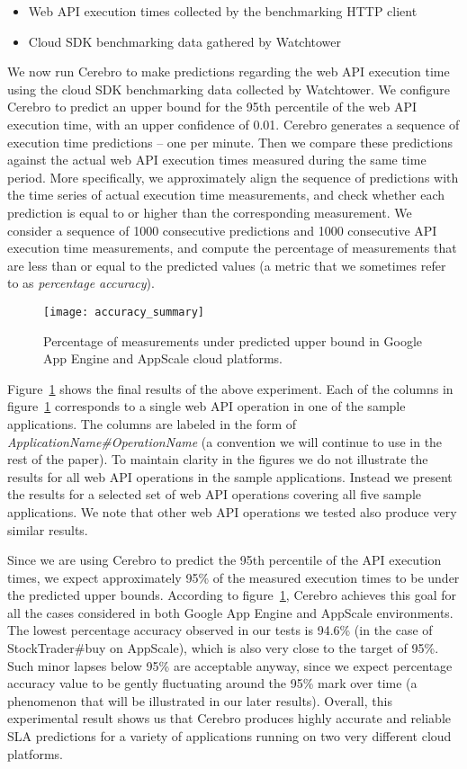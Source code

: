 \begin{itemize}
\item Web API execution times collected by the benchmarking HTTP client
\item Cloud SDK benchmarking data gathered by Watchtower
\end{itemize}

We now run Cerebro to make predictions regarding the web API execution time using the cloud SDK benchmarking data
collected by Watchtower. We configure Cerebro to predict an upper bound for the 95th percentile of the web API
execution time, with an upper confidence of 0.01. Cerebro generates a sequence of execution time predictions -- one 
per minute. Then we compare these predictions against the actual web API execution times measured during the same
time period. More specifically, we approximately align the sequence of predictions with the time series of actual execution
time measurements, and check whether each prediction is equal to or higher than the corresponding measurement. We consider a 
sequence of 1000 consecutive predictions and 1000 consecutive API execution
time measurements, and compute the percentage of measurements that are less than or equal to the predicted values (a
metric that we sometimes refer to as \textit{percentage accuracy}).
 

\begin{figure}
\centering
\texttt{[image: accuracy\_summary]}
\caption{Percentage of measurements under predicted upper bound in Google App Engine and AppScale cloud platforms.}
\label{fig:accuracy_summary}
\end{figure}

Figure~\ref{fig:accuracy_summary} shows the final results of the above experiment.
Each of the columns in figure~\ref{fig:accuracy_summary} corresponds to a single web API operation in 
one of the sample applications. The columns are labeled in the form of \textit{ApplicationName\#OperationName} (a convention 
we will continue to use in the rest of the paper). To maintain clarity in the figures we do not 
illustrate the results for all web API operations in the sample applications. Instead we present the results for a selected set of 
web API operations covering all five sample applications. We note that other web API operations we tested also produce
very similar results.

Since we are using Cerebro to predict the 95th percentile of the API execution times, we expect approximately 95\% of the measured execution
times to be under the predicted upper bounds. According to figure~\ref{fig:accuracy_summary}, Cerebro achieves this goal for all
the cases considered in both Google App Engine and AppScale environments. The lowest percentage accuracy observed
in our tests is 94.6\% (in the case of StockTrader\#buy on AppScale), which is also very close to the target of 95\%. Such minor
lapses below 95\% are acceptable anyway, since we expect percentage accuracy value to be gently fluctuating around the
95\% mark over time (a phenomenon that will be illustrated in our later results). Overall, this experimental result shows us that
Cerebro produces highly accurate and reliable SLA predictions for a variety of applications running on two very
different cloud platforms.

